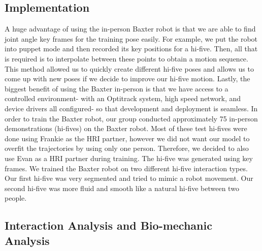 \documentclass[letterpaper, 10 pt, conference]{ieeeconf}  %
\begin{document}
\subsection{Implementation}
A huge advantage of using the in-person Baxter robot is that we are able to find joint angle key frames for the training pose easily. For example, we put the robot into puppet mode and then recorded its key positions for a hi-five. Then, all that is required is to interpolate between these points to obtain a motion sequence. This method allowed us to quickly create different hi-five poses and allows us to come up with new poses if we decide to improve our hi-five motion. Lastly, the biggest benefit of using the Baxter in-person is that we have access to a controlled environment- with an Optitrack system, high speed network, and device drivers all configured- so that development and deployment is seamless.
\newline
\indent In order to train the Baxter robot, our group conducted approximately 75 in-person demonstrations (hi-fives) on the Baxter robot. Most of these test hi-fives were done using Frankie as the HRI partner, however we did not want our model to overfit the trajectories by using only one person. Therefore, we decided to also use Evan as a HRI partner during training. The hi-five was generated using key frames. We trained the Baxter robot on two different hi-five interaction types. Our first hi-five was very segmented and tried to mimic a robot movement. Our second hi-five was more fluid and smooth like a natural hi-five between two people. 

\subsection{Interaction Analysis and Bio-mechanic Analysis}
\end{document}
